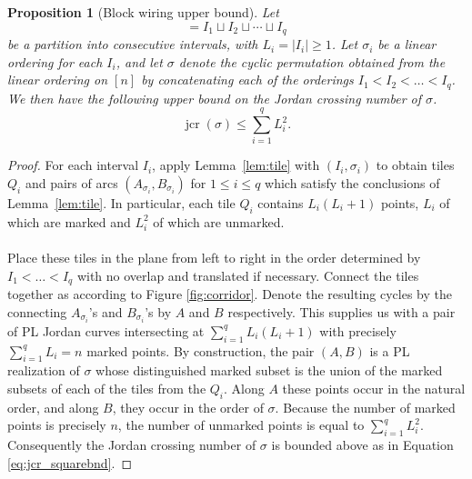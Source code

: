 \documentclass[11pt,a4paper]{amsart}
\newtheorem{proposition}[theorem]{Proposition}
\theoremstyle{definition}
\theoremstyle{remark}
\DeclareMathOperator{\jcr}{jcr}
\begin{document}
\begin{proposition}[Block wiring upper bound]\label{prop:block-upper}
Let
\begin{equation*}
        [n]=I_1\sqcup I_2\sqcup\cdots\sqcup I_{q}
\end{equation*}
be a partition into consecutive intervals, with $L_i=|I_i| \geq 1$.  Let $\sigma_{i}$ be a linear ordering for each $I_{i}$, and let $\sigma$ denote the cyclic permutation obtained from the linear ordering on $[n]$ by concatenating each of the orderings $I_{1} < I_{2} < \hdots < I_{q}$.  We then have the following upper bound on the Jordan crossing number of $\sigma$.
\begin{equation*}\label{eq:jcr_squarebnd}
        \jcr(\sigma)\le \sum_{i=1}^{q} L_i^2.
\end{equation*}
\end{proposition}

\begin{proof}
For each interval $I_{i}$, apply Lemma~\ref{lem:tile} with $(I_{i},\sigma_{i})$ to obtain tiles $Q_{i}$ and pairs of arcs $(A_{\sigma_{i}}, B_{\sigma_{i}})$ for $1 \leq i \leq q$ which satisfy the conclusions of Lemma~\ref{lem:tile}.  In particular, each tile $Q_{i}$ contains $L_{i}(L_{i}+1)$ points, $L_{i}$ of which are marked and $L_{i}^{2}$ of which are unmarked.  \\
\\
Place these tiles in the plane from left to right in the order determined by $I_{1} < \hdots < I_{q}$ with no overlap and translated if necessary.  Connect the tiles together as according to Figure \ref{fig:corridor}.  Denote the resulting cycles by the connecting $A_{\sigma_{i}}$'s and $B_{\sigma_{i}}$'s by $A$ and $B$ respectively.  This supplies us with a pair of PL Jordan curves intersecting at $\sum_{i=1}^{q} L_{i}(L_{i}+1)$ with precisely $\sum_{i=1}^{q} L_{i} = n$ marked points.  By construction, the pair $(A,B)$ is a PL realization of $\sigma$ whose distinguished marked subset is the union of the marked subsets of each of the tiles from the $Q_{i}$.  Along $A$ these points occur in the natural order, and along $B$, they occur in the order of $\sigma$.  Because the number of marked points is precisely $n$, the number of unmarked points is equal to $\sum_{i=1}^{q} L_{i}^{2}$.  Consequently the Jordan crossing number of $\sigma$ is bounded above as in Equation \ref{eq:jcr_squarebnd}.  
\end{proof}
\end{document}
